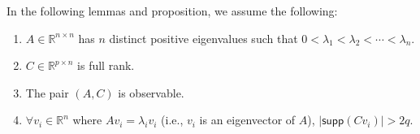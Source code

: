 \documentclass[../thesis.tex]{subfiles}
\newcommand{\norm}[1]{\left\lVert#1\right\rVert}
\begin{document}
%
%
%



In the following lemmas and proposition, we assume the following:

\begin{enumerate}
\item $A \in \mathbb{R}^{n\times n}$ has $n$ distinct positive eigenvalues such that $0 < \lambda_1 < \lambda_2 < \cdots < \lambda_n$.%
\item $C \in \mathbb{R}^{p \times n}$ is full rank. 
\item The pair $(A,C)$ is observable.
\item $\forall v_i \in \mathbb{R}^n$ where  $ Av_i = \lambda_i v_i $ (i.e., $v_i$ is an eigenvector of $A$), $ \lvert \textsf{supp}(Cv_i) \rvert > 2q$.
\end{enumerate}
                              
\end{document}
